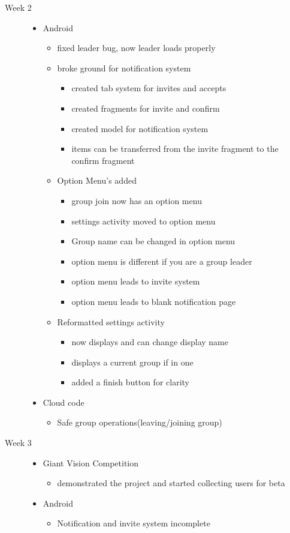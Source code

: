 \begin{description}
  \item[Week 2] \hfill
		\begin{itemize}
		\item Android
		\begin{itemize}
			\item fixed leader bug, now leader loads properly
			\item broke ground for notification system
			\begin{itemize}
				\item created tab system for invites and accepts
				\item created fragments for invite and confirm
				\item created model for notification system
				\item items can be transferred from the invite fragment to the confirm fragment
			\end{itemize}
			\item Option Menu's added 
			\begin{itemize}
				\item group join now has an option menu
				\item settings activity moved to option menu
				\item Group name can be changed in option menu
				\item option menu is different if you are a group leader
				\item option menu leads to invite system
				\item option menu leads to blank notification page
			\end{itemize}
			\item Reformatted settings activity
			\begin{itemize}
				\item now displays and can change display name
				\item displays a current group if in one
				\item added a finish button for clarity
			\end{itemize}
		\end{itemize}
		\item Cloud code
		\begin{itemize}
			\item Safe group operations(leaving/joining group)
		\end{itemize}
	\end{itemize}
  
  \item[Week 3] \hfill
		\begin{itemize}
		\item Giant Vision Competition
		\begin{itemize}
			\item demonstrated the project and started collecting users for beta
		\end{itemize}
		\item Android
		\begin{itemize}
			\item Notification and invite system incomplete
		\end{itemize}
	\end{itemize}
\end{description}

